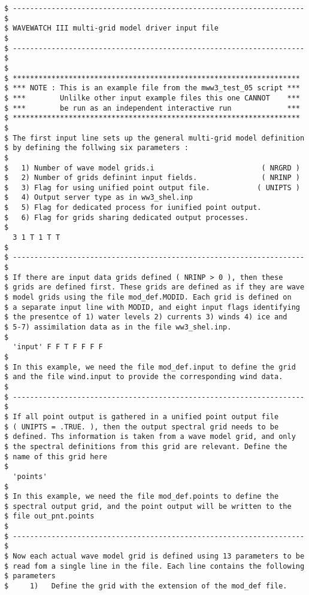 \begin{verbatim}
$ -------------------------------------------------------------------- $
$ WAVEWATCH III multi-grid model driver input file                     $
$ -------------------------------------------------------------------- $
$
$ *******************************************************************
$ *** NOTE : This is an example file from the mww3_test_05 script ***
$ ***        Unlilke other input example files this one CANNOT    ***
$ ***        be run as an independent interactive run             ***
$ *******************************************************************
$
$ The first input line sets up the general multi-grid model definition
$ by defining the follwing six parameters :
$
$   1) Number of wave model grids.i                         ( NRGRD )
$   2) Number of grids definint input fields.               ( NRINP )
$   3) Flag for using unified point output file.           ( UNIPTS )
$   4) Output server type as in ww3_shel.inp
$   5) Flag for dedicated process for iunified point output.
$   6) Flag for grids sharing dedicated output processes.
$
  3 1 T 1 T T
$
$ -------------------------------------------------------------------- $
$ If there are input data grids defined ( NRINP > 0 ), then these
$ grids are defined first. These grids are defined as if they are wave
$ model grids using the file mod_def.MODID. Each grid is defined on
$ a separate input line with MODID, and eight input flags identifying
$ the presentce of 1) water levels 2) currents 3) winds 4) ice and
$ 5-7) assimilation data as in the file ww3_shel.inp.
$
  'input' F F T F F F F
$
$ In this example, we need the file mod_def.input to define the grid
$ and the file wind.input to provide the corresponding wind data.
$
$ -------------------------------------------------------------------- $
$ If all point output is gathered in a unified point output file
$ ( UNIPTS = .TRUE. ), then the output spectral grid needs to be 
$ defined. Ths information is taken from a wave model grid, and only
$ the spectral definitions from this grid are relevant. Define the
$ name of this grid here
$
  'points'
$
$ In this example, we need the file mod_def.points to define the
$ spectral output grid, and the point output will be written to the
$ file out_pnt.points
$
$ -------------------------------------------------------------------- $
$ Now each actual wave model grid is defined using 13 parameters to be
$ read fom a single line in the file. Each line contains the following
$ parameters
$     1)   Define the grid with the extension of the mod_def file.

\end{verbatim}
